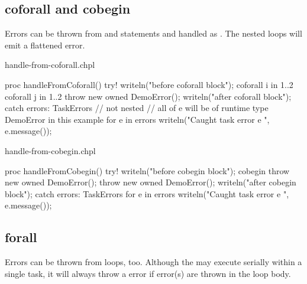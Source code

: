 \subsection{coforall and cobegin}
\label{Errors_coforall_and_cobegin}

Errors can be thrown from  and 
statements and handled as . The nested 
loops will emit a flattened  error.

\begin{chapelexample}{handle-from-coforall.chpl}
\begin{chapel}
proc handleFromCoforall() {
  try! {
    writeln("before coforall block");
    coforall i in 1..2 {
      coforall j in 1..2 {
        throw new owned DemoError();
      }
    }
    writeln("after coforall block");
  } catch errors: TaskErrors { // not nested
    // all of e will be of runtime type DemoError in this example
    for e in errors {
      writeln("Caught task error e ", e.message());
    }
  }
}
\end{chapel}
\begin{chapelpost}
\end{chapelpost}
\begin{chapeloutput}
\end{chapeloutput}
\end{chapelexample}

\begin{chapelexample}{handle-from-cobegin.chpl}
\begin{chapel}
proc handleFromCobegin() {
  try! {
    writeln("before cobegin block");
    cobegin {
      throw new owned DemoError();
      throw new owned DemoError();
    }
    writeln("after cobegin block");
  } catch errors: TaskErrors {
    for e in errors {
      writeln("Caught task error e ", e.message());
    }
  }
}
\end{chapel}
\begin{chapelpost}
\end{chapelpost}
\begin{chapeloutput}
\end{chapeloutput}
\end{chapelexample}

\subsection{forall}
\label{Errors_forall}

Errors can be thrown from  loops, too.
Although the  may execute serially within
a single task, it will always throw a  error
if error(s) are thrown in the loop body.

